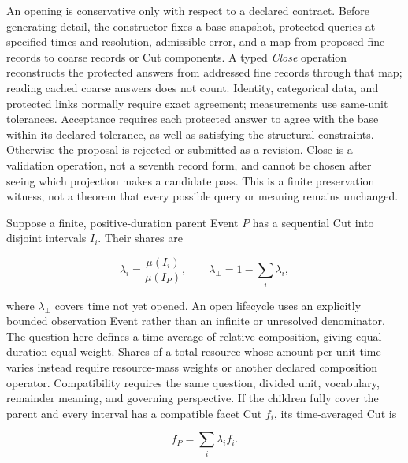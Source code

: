 \documentclass[11pt,a4paper]{article}
\begin{document}
An opening is conservative only with respect to a declared contract. Before
generating detail, the constructor fixes a base snapshot, protected queries at
specified times and resolution, admissible error, and a map from proposed fine
records to coarse records or Cut components. A typed \emph{Close} operation
reconstructs the protected answers from addressed fine records through that map;
reading cached coarse answers does not count. Identity, categorical data, and
protected links normally require exact agreement; measurements use same-unit
tolerances. Acceptance requires each
protected answer to agree with the base within its declared tolerance, as well
as satisfying the structural constraints. Otherwise the proposal is rejected
or submitted as a revision. Close is a validation operation, not a seventh
record form, and cannot be chosen after seeing which projection makes a
candidate pass. This is a finite preservation witness, not a theorem that every
possible query or meaning remains unchanged.

Suppose a finite, positive-duration parent Event $P$ has a sequential Cut into disjoint intervals
$I_i$. Their shares are

\begin{equation}
 \lambda_i=\frac{\mu(I_i)}{\mu(I_P)},\qquad
 \lambda_{\bot}=1-\sum_i\lambda_i,
 \label{eq:duration-shares-theory}
\end{equation}

where $\lambda_{\bot}$ covers time not yet opened. An open lifecycle uses an
explicitly bounded observation Event rather than an infinite or unresolved
denominator. The question here defines a time-average of relative composition,
giving equal duration equal weight. Shares of a total resource whose amount per
unit time varies instead require resource-mass weights or another declared
composition operator. Compatibility requires the same question, divided unit,
vocabulary, remainder meaning, and governing perspective. If the children fully
cover the parent and every interval has a compatible facet Cut $f_i$, its
time-averaged Cut is

\begin{equation}
 f_P=\sum_i\lambda_i f_i.
 \label{eq:mixture-law-theory}
\end{equation}
\end{document}
